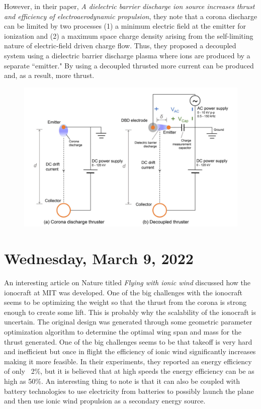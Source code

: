 \documentclass[12pt]{report}
\begin{document}
\par
However, in their paper, \textit{A dielectric barrier discharge ion source increases thrust and efficiency of electroaerodynamic propulsion}, they note that a corona discharge can be limited by two processes (1) a minimum electric field at the emitter for ionization and (2) a maximum space charge density arising from the self-limiting nature of electric-field driven charge flow. Thus, they proposed a decoupled system using a dielectric barrier discharge plasma where ions are produced by a separate ``emitter." By using a decoupled thrusted more current can be produced and, as a result, more thrust. 

\begin{figure}[H]
\centering
\includegraphics[width=\linewidth]{images/dbd thruster schematic.pdf}
\end{figure}

\section{Wednesday, March 9, 2022}

\par
An interesting article on Nature titled \textit{Flying with ionic wind} discussed how the ionocraft at MIT was developed. One of the big challenges with the ionocraft seems to be optimizing the weight so that the thrust from the corona is strong enough to create some lift.  This is probably why the scalability of the ionocraft is uncertain.  The original design was generated through some geometric parameter optimization algorithm to determine the optimal wing span and mass for the thrust generated.  One of the big challenges seems to be that takeoff is very hard and inefficient but once in flight the efficiency of ionic wind significantly increases making it more feasible. In their experiments, they reported an energy efficiency of only ~2\%, but it is believed that at high speeds the energy efficiency can be as high as 50\%. An interesting thing to note is that it can also be coupled with battery technologies to use electricity from batteries to possibly launch the plane and then use ionic wind propulsion as a secondary energy source.
\end{document}
